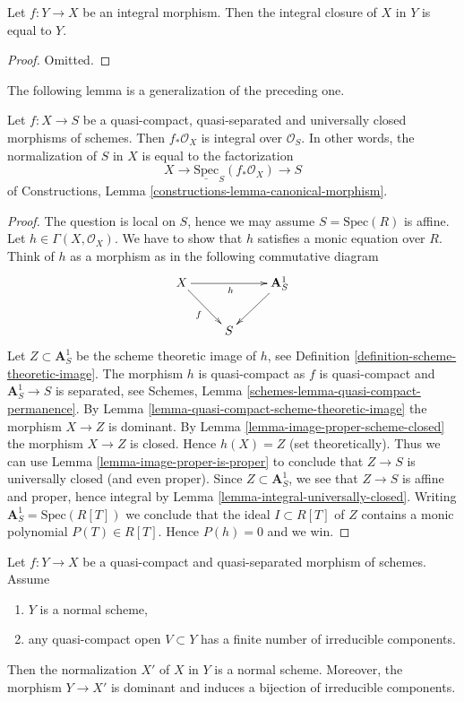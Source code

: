 \begin{lemma}
\label{lemma-normalization-in-integral}
Let $f : Y \to X$ be an integral morphism.
Then the integral closure of $X$ in $Y$ is equal to $Y$.
\end{lemma}

\begin{proof}
Omitted.
\end{proof}

\noindent
The following lemma is a generalization of the preceding one.

\begin{lemma}
\label{lemma-normalization-in-universally-closed}
Let $f : X \to S$ be a quasi-compact, quasi-separated and
universally closed morphisms of schemes.
Then $f_*\mathcal{O}_X$ is integral over $\mathcal{O}_S$. In other
words, the normalization of $S$ in $X$ is equal to the factorization
$$
X \longrightarrow \underline{\text{Spec}}_S(f_*\mathcal{O}_X)
\longrightarrow S
$$
of Constructions, Lemma \ref{constructions-lemma-canonical-morphism}.
\end{lemma}

\begin{proof}
The question is local on $S$, hence we may assume $S = \text{Spec}(R)$
is affine. Let $h \in \Gamma(X, \mathcal{O}_X)$. We have to show that
$h$ satisfies a monic equation over $R$. Think of $h$ as a morphism
as in the following commutative diagram
$$
\xymatrix{
X \ar[rr]_h \ar[rd]_f & & \mathbf{A}^1_S \ar[ld] \\
& S &
}
$$
Let $Z \subset \mathbf{A}^1_S$ be the scheme theoretic image of $h$,
see Definition \ref{definition-scheme-theoretic-image}.
The morphism $h$ is quasi-compact as $f$ is quasi-compact and
$\mathbf{A}^1_S \to S$ is separated, see
Schemes, Lemma \ref{schemes-lemma-quasi-compact-permanence}.
By Lemma \ref{lemma-quasi-compact-scheme-theoretic-image} the
morphism $X \to Z$ is dominant. By
Lemma \ref{lemma-image-proper-scheme-closed} the morphism
$X \to Z$ is closed. Hence $h(X) = Z$ (set theoretically).
Thus we can use
Lemma \ref{lemma-image-proper-is-proper}
to conclude that $Z \to S$ is universally closed (and even proper).
Since $Z \subset \mathbf{A}^1_S$, we see that $Z \to S$ is affine
and proper, hence integral by Lemma \ref{lemma-integral-universally-closed}.
Writing $\mathbf{A}^1_S = \text{Spec}(R[T])$ we conclude that
the ideal $I \subset R[T]$ of $Z$ contains a monic polynomial
$P(T) \in R[T]$. Hence $P(h) = 0$ and we win.
\end{proof}

\begin{lemma}
\label{lemma-normal-normalization}
Let $f : Y \to X$ be a quasi-compact and quasi-separated morphism
of schemes. Assume
\begin{enumerate}
\item $Y$ is a normal scheme,
\item any quasi-compact open $V \subset Y$ has a finite number of
irreducible components.
\end{enumerate}
Then the normalization $X'$ of $X$ in $Y$ is a normal scheme. Moreover,
the morphism $Y \to X'$ is dominant and induces a bijection of
irreducible components.
\end{lemma}

